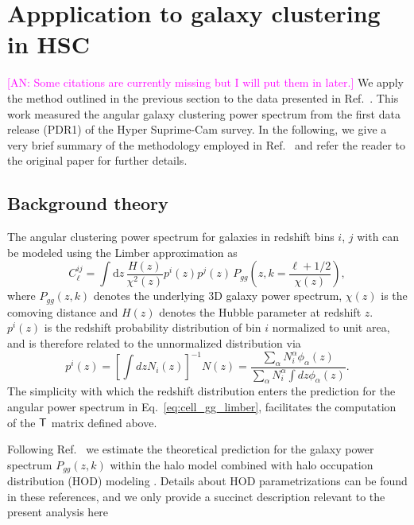 \documentclass[a4paper,11pt]{article}
\newcommand{\an}[1]{{\textcolor{magenta}{[AN: #1]}}}
\begin{document}
  \section{Appplication to galaxy clustering in HSC}\label{sec:hsc}
    \an{Some citations are currently missing but I will put them in later.}
    We apply the method outlined in the previous section to the data presented in Ref.~\cite{1912.08209}. This work measured the angular galaxy clustering power spectrum from the first data release (PDR1) of the Hyper Suprime-Cam survey. In the following, we give a very brief summary of the methodology employed in Ref.~\cite{1912.08209} and refer the reader to the original paper for further details.
    
    \subsection{Background theory}\label{ssec:hsc.theory}
      The angular clustering power spectrum for galaxies in redshift bins $i$, $j$ with can be modeled using the Limber approximation as \cite{1953ApJ...117..134L, 1992ApJ...388..272K, Kaiser:1998}
      \begin{equation}\label{eq:cell_gg_limber}
        C^{ij}_\ell = \int \mathrm{d}z\,\frac{H(z)}{\chi^2(z)} p^i(z)p^j(z)\,P_{gg}\left(z,k=\frac{\ell+1/2}{\chi(z)}\right),
      \end{equation}
      where $P_{gg}(z,k)$ denotes the underlying 3D galaxy power spectrum, $\chi(z)$ is the comoving distance and $H(z)$ denotes the Hubble parameter at redshift $z$. $p^i(z)$ is the redshift probability distribution of bin $i$ normalized to unit area, and is therefore related to the unnormalized distribution via
      \begin{equation}
        p^i(z)=\left[\int dz N_i(z)\right]^{-1}N(z)=\frac{\sum_\alpha N^\alpha_i\phi_\alpha(z)}{\sum_\alpha N^\alpha_i\int dz\phi_\alpha(z)}.
      \end{equation}
      The simplicity with which the redshift distribution enters the prediction for the angular power spectrum in Eq.~\ref{eq:cell_gg_limber}, facilitates the computation of the ${\sf T}$ matrix defined above. 

      Following Ref.~\cite{1912.08209} we estimate the theoretical prediction for the galaxy power spectrum $P_{gg}(z,k)$ within the halo model combined with halo occupation distribution (HOD) modeling \cite{2000MNRAS.318.1144P,2002PhR...372....1C,2002ApJ...575..587B,2005ApJ...633..791Z,2013MNRAS.430..725V}. Details about HOD parametrizations can be found in these references, and we only provide a succinct description relevant to the present analysis here
\end{document}
